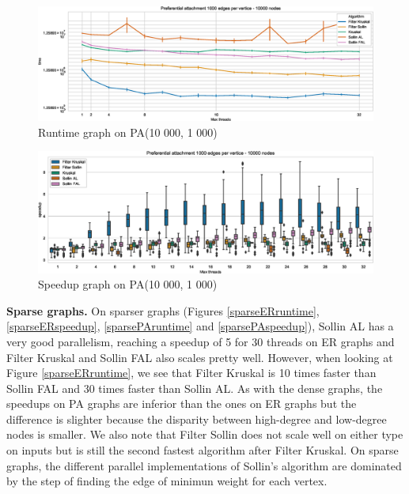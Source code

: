 \documentclass[letterpaper]{article}
\newcommand{\mypar}[1]{{\bf #1.}}
\begin{document}
\begin{figure}\centering
  \includegraphics[width=\linewidth]{graphics/Graph_runtime_Preferential_attachment_1000_edges_per_vertice_10000.eps}
  \caption{Runtime graph on PA(10 000, 1 000)\label{densePAruntime}}
\end{figure}

\begin{figure}\centering
  \includegraphics[width=\linewidth]{graphics/Box_Speedup_Preferential_attachment_1000_edges_per_vertice_10000.eps}
  \caption{Speedup graph on PA(10 000, 1 000)\label{densePAspeedup}}
\end{figure}



\mypar{Sparse graphs} On sparser graphs (Figures \ref{sparseERruntime}, \ref{sparseERspeedup}, \ref{sparsePAruntime} and \ref{sparsePAspeedup}), Sollin AL has a very good parallelism, reaching a speedup of 5 for 30 threads on ER graphs and Filter Kruskal and Sollin FAL also scales pretty well. However, when looking at Figure \ref{sparseERruntime}, we see that Filter Kruskal is 10 times faster than Sollin FAL and 30 times faster than Sollin AL. As with the dense graphs, the speedups on PA graphs are inferior than the ones on ER graphs but the difference is slighter because the disparity between high-degree and low-degree nodes is smaller. We also note that Filter Sollin does not scale well on either type on inputs but is still the second fastest algorithm after Filter Kruskal. On sparse graphs, the different parallel implementations of Sollin's algorithm are dominated by the step of finding the edge of minimun weight for each vertex.
\end{document}
